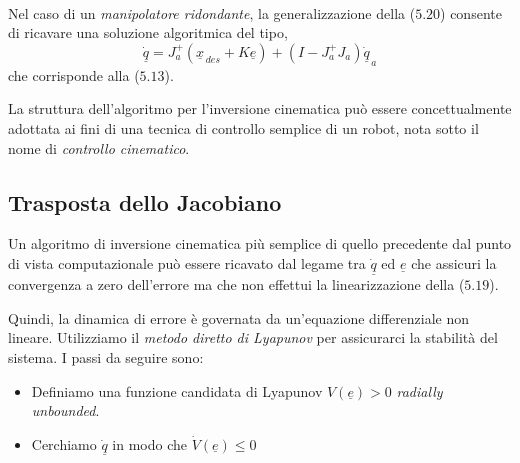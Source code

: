 \paragraph{}
Nel caso di un \emph{manipolatore ridondante}, la generalizzazione della ($5.20$) consente di ricavare una soluzione algoritmica del tipo,
\begin{equation}
	\underline{\dot{q}} = J^+_a(\underline{x}_{\,des} + K\underline{e}) + (I - J^+_aJ_a)\underline{\dot{q}}_{\,a}
\end{equation}
che corrisponde alla ($5.13$).

La struttura dell'algoritmo per l'inversione cinematica può essere concettualmente adottata ai fini di una tecnica di controllo semplice di un robot, nota sotto il nome di \emph{controllo cinematico}.

\subsection{Trasposta dello Jacobiano}
Un algoritmo di inversione cinematica più semplice di quello precedente dal punto di vista computazionale può essere ricavato dal legame tra $\underline{\dot{q}}$ ed $\underline{e}$ che assicuri la convergenza a zero dell'errore ma che non effettui la linearizzazione della ($5.19$). 

Quindi, la dinamica di errore è governata da un'equazione differenziale non lineare. Utilizziamo il \emph{metodo diretto di Lyapunov} per assicurarci la stabilità del sistema. I passi da seguire sono:
\begin{itemize}
	\item Definiamo una funzione candidata di Lyapunov $V(\underline{e})>0$ \emph{radially unbounded}.
	\item Cerchiamo $\underline{\dot{q}}$ in modo che $\dot{V}(\underline{e}) \leqslant 0$
\end{itemize}
